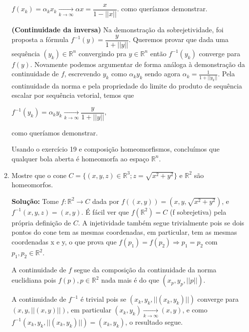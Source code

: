 \documentclass[12pt]{article}
\newcommand{\rr}{\mathbb{R}^2}
\newcommand{\rn}{\mathbb{R}^n}
\begin{document}
\begin{enumerate}
$f(x_k)=\alpha_kx_k\xrightarrow[k\to\infty]{}\alpha x=\dfrac{x}{1-||x||}$. como queríamos demonstrar.

\textbf{(Continuidade da inversa)} Na demonstração da sobrejetividade, foi proposta a fórmula $f^{-1}(y)=\dfrac{y}{1+||y||}$. Queremos provar que dada uma sequência $(y_k)\in \rn$ convergindo pra $y\in\rn$ então $f^{-1}(y_k)$ converge para $f(y)$.
Novamente podemos argumentar de forma análoga à demonstração da continuidade de $f$, escrevendo $y_k$ como $\alpha_ky_k$ sendo agora $\alpha_k=\frac{1}{1+||y_k||}$. Pela continuidade da norma e pela propriedade do limite do produto de sequência escalar por sequência vetorial, temos que 

$f^{-1}(y_k)=\alpha_ky_k\xrightarrow[k\to\infty]{}\dfrac{y}{1+||y||},$

como queríamos demonstrar.

Usando o exercício 19 e composição homeomorfismos, concluímos que qualquer bola aberta é homeomorfa ao espaço $\rn$.

\item Mostre que o cone $C = \{(x,y,z) \in \mathbb{R}^3; z = \sqrt{x^2 + y^2}\}$ e $\mathbb{R}^2$ são homeomorfos.

\textbf{Solução:} Tome $f:\rr\to C$ dada por $f((x,y))=(x,y,\sqrt{x^2+y^2})$, e $f^{-1}(x,y,z)=(x,y)$. É fácil ver que $f(\rr)=C$ (f sobrejetiva) pela própria definição de $C$. A injetividade também segue trivialmente pois se dois pontos do cone tem as mesmas coordenadas, em particular, tem as mesmas coordenadas x e y, o que prova que $f(p_1)=f(p_2)\Rightarrow p_1=p_2$ com $p_1,p_2\in\rr$.

A continuidade de $f$ segue da composição da continuidade da norma euclidiana pois $f(p),p\in\rr$ nada mais é do que $(x_p,y_p,||p||)$.

A continuidade de $f^{-1}$ é trivial pois se $(x_k,y_k,||(x_k,y_k)||)$ converge para $(x,y,||(x,y)||)$, em particular $(x_k,y_k)\xrightarrow[k\to\infty]{}(x,y)$, e como $f^{-1}(x_k,y_k,||(x_k,y_k)||)=(x_k,y_k)$, o resultado segue.

\end{enumerate}
	\newpage
	 


\end{document}
